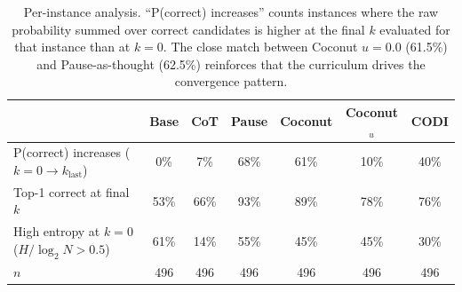 \begin{table}[h!]
\centering
\small
\caption{Per-instance analysis. ``P(correct) increases'' counts instances where the raw probability summed over correct candidates is higher at the final $k$ evaluated for that instance than at $k{=}0$. The close match between Coconut $u{=}0.0$ (61.5\%) and Pause-as-thought (62.5\%) reinforces that the curriculum drives the convergence pattern.}
\begin{tabular}{l cccccc}
\toprule
 & Base & CoT & Pause & Coconut & Coconut$_{u}$ & CODI \\
\midrule
P(correct) increases ($k{=}0 \to k_{\text{last}}$) & 0\% & 7\% & 68\% & 61\% & 10\% & 40\% \\
Top-1 correct at final $k$ & 53\% & 66\% & 93\% & 89\% & 78\% & 76\% \\
High entropy at $k{=}0$ ($H/\log_2 N > 0.5$) & 61\% & 14\% & 55\% & 45\% & 45\% & 30\% \\
\midrule
$n$ & 496 & 496 & 496 & 496 & 496 & 496 \\
\bottomrule
\end{tabular}
\label{tab:per_instance_statistics}
\end{table}
